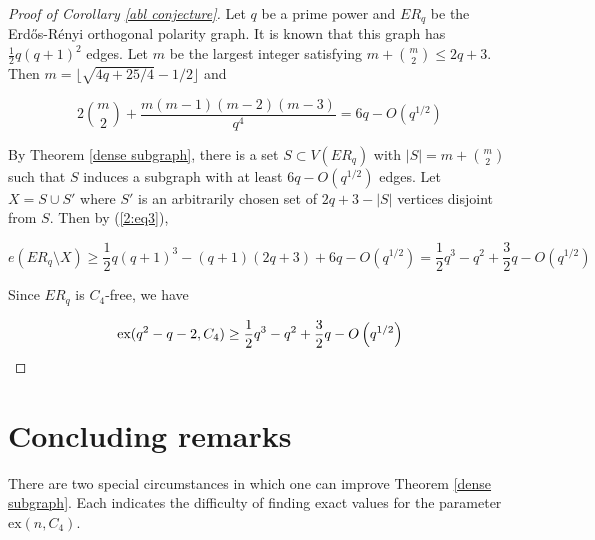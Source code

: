 \documentclass[12pt]{article}
\begin{document}
\begin{proof}[Proof of Corollary \ref{abl conjecture}]
    Let $q$ be a prime power and $ER_q$ be the Erd\H{o}s-R\'{e}nyi orthogonal polarity graph.  It is known that this graph has
    $\frac{1}{2}q(q+1)^2$ edges.  Let $m$ be the largest integer satisfying $m+\binom{m}{2} \leq 2q+3$.
    Then $m = \lfloor \sqrt{4q + 25/4}  - 1/2 \rfloor$ and

    $$ 2 \binom{m}{2} + \frac{ m (m - 1)(m-2)(m-3) }{q^4} = 6q - O(q^{1/2} ) $$

    By Theorem \ref{dense subgraph}, there is a set $S \subset V(ER_q)$ with $|S| = m + \binom{m}{2}$ such that
    $S$ induces a subgraph with at least $6q - O (q^{1/2})$ edges.  Let $X = S \cup S'$ where $S'$ is an arbitrarily chosen set of
    $2q + 3 - |S|$ vertices disjoint from $S$.  Then by (\ref{2:eq3}),

    $$ e( ER_q \setminus X) \geq \frac{1}{2}q(q+1)^3 - (q+1)(2q +3) + 6q - O(q^{1/2} ) =  \frac{1}{2}q^3 - q^2 + \frac{3}{2}q - O\left(q^{1/2}\right) $$

    Since $ER_q$ is $C_4$-free, we have

    $$ \textup{ex}( q^2 - q - 2 , C_4)  \geq \frac{1}{2}q^3 - q^2 + \frac{3}{2}q - O\left(q^{1/2}\right) $$
\end{proof}


\section{Concluding remarks}\label{conclusion}


There are two special circumstances in which one can improve Theorem \ref{dense subgraph}. Each indicates the difficulty of finding exact values for the parameter $\mathrm{ex}(n, C_4)$.
\end{document}
